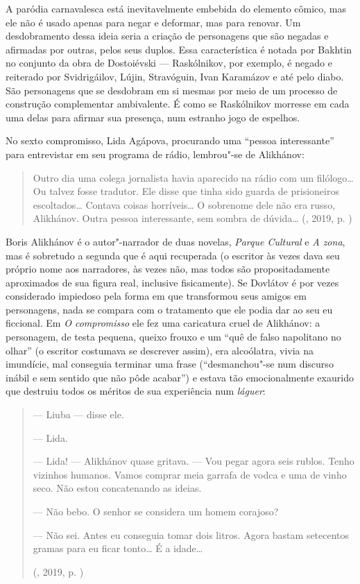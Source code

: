 A paródia carnavalesca está inevitavelmente embebida do elemento cômico,
mas ele não é usado apenas para negar e deformar, mas para renovar. Um
desdobramento dessa ideia seria a criação de personagens que são negadas
e afirmadas por outras, pelos seus duplos. Essa característica é notada
por Bakhtin no conjunto da obra de Dostoiévski --- Raskólnikov, por
exemplo, é negado e reiterado por Svidrigáilov, Lújin, Stravóguin, Ivan
Karamázov e até pelo diabo. São personagens que se desdobram em si
mesmas por meio de um processo de construção complementar ambivalente. É
como se Raskólnikov morresse em cada uma delas para afirmar sua
presença, num estranho jogo de espelhos.

No sexto compromisso, Lida Agápova, procurando uma ``pessoa
interessante'' para entrevistar em seu programa de rádio, lembrou"-se de
Alikhánov:

\begin{quote}
Outro dia uma colega jornalista havia aparecido na rádio com um
filólogo\ldots{} Ou talvez fosse tradutor. Ele disse que tinha sido guarda de
prisioneiros escoltados\ldots{} Contava coisas horríveis\ldots{} O sobrenome dele
não era russo, Alikhánov. Outra pessoa interessante, sem sombra de
dúvida\ldots{} (, 2019, p. \pageref{ref1})
\end{quote}

Boris Alikhánov é o autor"-narrador de duas novelas, \emph{Parque
Cultural} e \emph{A zona}, mas é sobretudo a segunda que é aqui
recuperada (o escritor às vezes dava seu próprio nome aos narradores, às
vezes não, mas todos são propositadamente aproximados de sua figura
real, inclusive fisicamente). Se Dovlátov é por vezes considerado
impiedoso pela forma em que transformou seus amigos em personagens, nada
se compara com o tratamento que ele podia dar ao seu eu ficcional. Em
\emph{O compromisso} ele fez uma caricatura cruel de Alikhánov: a
personagem, de testa pequena, queixo frouxo e um ``quê de falso
napolitano no olhar'' (o escritor costumava se descrever assim), era
alcoólatra, vivia na imundície, mal conseguia terminar uma frase
(``desmanchou"-se num discurso inábil e sem sentido que não pôde
acabar'') e estava tão emocionalmente exaurido que destruiu todos os
méritos de sua experiência num \emph{láguer}:

\begin{quote}
\forceindent{}--- Liuba --- disse ele.

--- Lida.

--- Lida! --- Alikhánov quase gritava. --- Vou pegar agora seis rublos.
Tenho vizinhos humanos. Vamos comprar meia garrafa de vodca e uma de
vinho seco. Não estou concatenando as ideias.

--- Não bebo. O senhor se considera um homem corajoso?

--- Não sei. Antes eu conseguia tomar dois litros. Agora bastam
setecentos gramas para eu ficar tonto\ldots{} É a idade\ldots{}

(, 2019, p. \pageref{ref7})
\end{quote}

